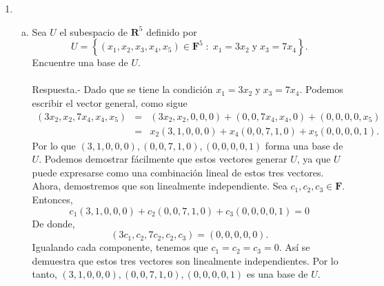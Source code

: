 \begin{enumerate}[\bfseries 1.]
\begin{enumerate}[(a)]
	\end{enumerate}

    \item 
	\begin{enumerate}[a).]

	    \item Sea $U$ el subespacio de $\textbf{R}^5$ definido por
	    $$U=\left\{(x_1,x_2,x_3,x_4,x_5)\in \textbf{F}^5\; : \; x_1=3x_2\;\mbox{y}\; x_3=7x_4\right\}.$$
	    Encuentre una base de $U$.\\\\
		Respuesta.-\; Dado que se tiene la condición $x_1=3x_2\;\mbox{y}\; x_3=7x_4$. Podemos escribir el vector general, como sigue
		$$
		\begin{array}{rcl}
		    (3x_2,x_2,7x_4,x_4,x_5) &=& (3x_2,x_2,0,0,0)+(0,0,7x_4,x_4,0)+(0,0,0,0,x_5)\\
					  &=& x_2(3,1,0,0,0)+x_4(0,0,7,1,0)+x_5(0,0,0,0,1).
		\end{array}
		$$
		Por lo que $(3,1,0,0,0),(0,0,7,1,0),(0,0,0,0,1)$ forma una base de $U$. Podemos demostrar fácilmente que estos vectores generar $U$, ya que $U$ puede expresarse como una combinación lineal de estos tres vectores. Ahora, demostremos que son linealmente independiente. Sea $c_1,c_2,c_3\in \textbf{F}$. Entonces, 
		$$c_1(3,1,0,0,0)+c_2(0,0,7,1,0)+c_3(0,0,0,0,1)=0$$
		De donde,
		$$(3c_1,c_2,7c_2,c_2,c_3)=(0,0,0,0,0).$$
		Igualando cada componente, tenemos que $c_1=c_2=c_3=0$. Así se demuestra que estos tres vectores son linealmente independientes. Por lo tanto, $(3,1,0,0,0),(0,0,7,1,0),(0,0,0,0,1)$ es una base de $U$.\\\\


\end{enumerate}
\end{enumerate}
